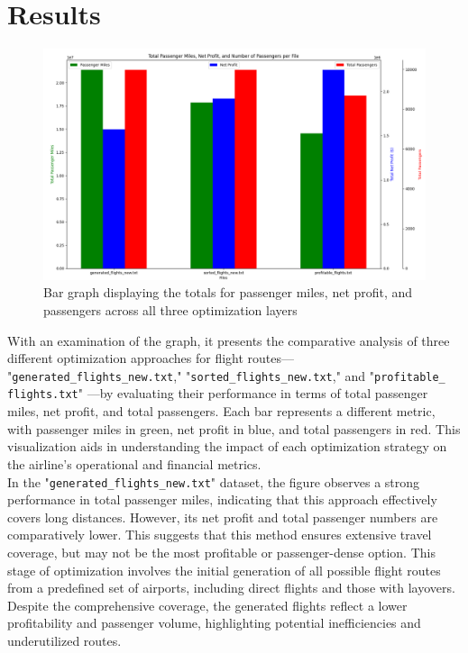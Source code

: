 \documentclass{article}
\begin{document}
\section{Results}

\begin{figure}[H] 
\centering

\begin{minipage}{\textwidth}
    \centering
    \includegraphics[width=\textwidth]{images/Figure_1.png}
    \caption {Bar graph displaying the totals for passenger miles, net profit, and passengers across all three optimization layers}
    \label{fig:bottom}
\end{minipage}

\end{figure}

With an examination of the graph, it presents the comparative analysis of three different optimization approaches for flight routes— "\texttt{generated\_flights\_new.txt}," "\texttt{sorted\_flights\_new.txt}," and "\texttt{profitable\_
flights.txt}" —by evaluating their performance in terms of total passenger miles, net profit, and total passengers. Each bar represents a different metric, with passenger miles in green, net profit in blue, and total passengers in red. This visualization aids in understanding the impact of each optimization strategy on the airline's operational and financial metrics.\\

In the "\texttt{generated\_flights\_new.txt}" dataset, the figure observes a strong performance in total passenger miles, indicating that this approach effectively covers long distances. However, its net profit and total passenger numbers are comparatively lower. This suggests that this method ensures extensive travel coverage, but may not be the most profitable or passenger-dense option. This stage of optimization involves the initial generation of all possible flight routes from a predefined set of airports, including direct flights and those with layovers. Despite the comprehensive coverage, the generated flights reflect a lower profitability and passenger volume, highlighting potential inefficiencies and underutilized routes.\\
\end{document}
